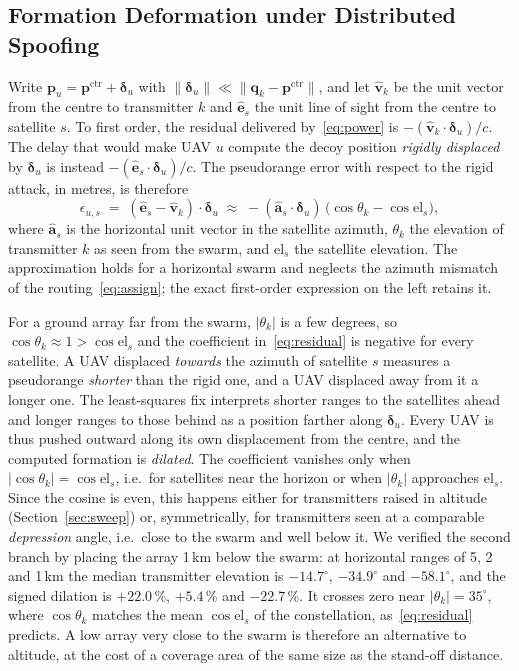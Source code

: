 \documentclass[conference]{IEEEtran}
\newcommand{\ptrue}[1]{\mathbf{p}_{#1}}
\begin{document}
\subsection{Formation Deformation under Distributed Spoofing}
\label{sec:residual}
Write $\ptrue{u}=\mathbf{p}^{\mathrm{ctr}}+\boldsymbol{\delta}_u$ with
$\lVert\boldsymbol{\delta}_u\rVert\ll\lVert\mathbf{q}_k-\mathbf{p}^{\mathrm{ctr}}\rVert$,
and let $\hat{\mathbf{v}}_k$ be the unit vector from the centre to
transmitter $k$ and $\hat{\mathbf{e}}_s$ the unit line of sight from the
centre to satellite $s$. To first order, the residual delivered
by~\eqref{eq:power} is
$-(\hat{\mathbf{v}}_k\!\cdot\!\boldsymbol{\delta}_u)/c$. The delay that
would make UAV $u$ compute the decoy position \emph{rigidly displaced}
by $\boldsymbol{\delta}_u$ is instead
$-(\hat{\mathbf{e}}_s\!\cdot\!\boldsymbol{\delta}_u)/c$. The pseudorange
error with respect to the rigid attack, in metres, is therefore
\begin{equation}
\epsilon_{u,s}\;=\;(\hat{\mathbf{e}}_s-\hat{\mathbf{v}}_k)\cdot\boldsymbol{\delta}_u
\;\approx\;-(\hat{\mathbf{a}}_s\!\cdot\!\boldsymbol{\delta}_u)\,
\bigl(\cos\theta_k-\cos\mathrm{el}_s\bigr),
\label{eq:residual}
\end{equation}
where $\hat{\mathbf{a}}_s$ is the horizontal unit vector in the satellite
azimuth, $\theta_k$ the elevation of transmitter $k$ as seen from the
swarm, and $\mathrm{el}_s$ the satellite elevation. The approximation
holds for a horizontal swarm and neglects the azimuth mismatch of the
routing~\eqref{eq:assign}; the exact first-order expression on the left
retains it.

For a ground array far from the swarm, $|\theta_k|$ is a few degrees, so
$\cos\theta_k\approx1>\cos\mathrm{el}_s$ and the coefficient
in~\eqref{eq:residual} is negative for every satellite. A UAV displaced
\emph{towards} the azimuth of satellite $s$ measures a pseudorange
\emph{shorter} than the rigid one, and a UAV displaced away from it a
longer one. The least-squares fix interprets shorter ranges to the
satellites ahead and longer ranges to those behind as a position farther
along $\boldsymbol{\delta}_u$. Every UAV is thus pushed outward along
its own displacement from the centre, and the computed formation is
\emph{dilated}. The coefficient vanishes only when
$|\cos\theta_k|=\cos\mathrm{el}_s$, i.e.\ for satellites near the
horizon or when $|\theta_k|$ approaches $\mathrm{el}_s$. Since the cosine
is even, this happens either for transmitters raised in altitude
(Section~\ref{sec:sweep}) or, symmetrically, for transmitters seen at a
comparable \emph{depression} angle, i.e.\ close to the swarm and well
below it. We verified the second branch by placing the array 1\,km below
the swarm: at horizontal ranges of 5, 2 and 1\,km the median transmitter
elevation is $-14.7^\circ$, $-34.9^\circ$ and $-58.1^\circ$, and the
signed dilation is $+22.0$\,\%, $+5.4$\,\% and $-22.7$\,\%. It crosses
zero near $|\theta_k|=35^\circ$, where $\cos\theta_k$ matches the mean
$\cos\mathrm{el}_s$ of the constellation, as~\eqref{eq:residual}
predicts. A low array very close to the swarm is therefore an
alternative to altitude, at the cost of a coverage area of the same size
as the stand-off distance.
\end{document}
